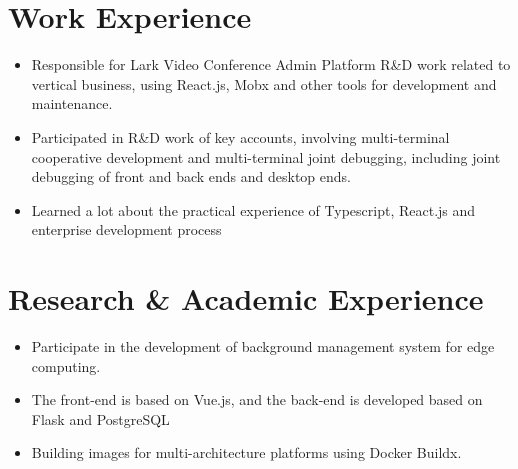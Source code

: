 \documentclass{resume}
\newcommand{\en}[1]{#1}
\newcommand{\zh}[1]{}
\begin{document}
\section{\en{Work Experience}\zh{工作经历}}
\en{}
\zh{\datedsubsection{\textbf{\href{https://www.bytedance.com/zh/}{字节跳动（ByteDance Inc.）}}}{2021/07 -- 2021/09}}
\en{}
\zh{\role{飞书会议室解决方案团队}{前端研发实习}}
\begin{itemize}
      \item \en{Responsible for Lark Video Conference Admin Platform R\&D work related to vertical business, using React.js, Mobx and other tools for development and maintenance.}
            \zh{负责飞书会议室 Admin 中会议室模块和视频会议模块相关垂直业务的前端研发，使用 React.js 和 Mobx 等工具进行业务等开发和维护}
      \item \en{Participated in R\&D work of key accounts, involving multi-terminal cooperative development and multi-terminal joint debugging, including joint debugging of front and back ends and desktop ends.}
            \zh{参与重点客户相关需求的开发，涉及到了多端合作开发与多端联合调试，包括前后端以及桌面端的联合调试}
      \item \en{Learned a lot about the practical experience of Typescript, React.js and enterprise development process}
            \zh{学到了很多关于 Typescript，React 以及企业级开发流程的实战经验}
\end{itemize}

\section{\en{Research \& Academic Experience}\zh{研究经历}}
\en{}
\zh{\datedsubsection{\textbf{中国科学院自动化研究所}}{2019/04 -- 2020/06}}
\en{}
\zh{\role{复杂系统管理与控制国家重点实验室}{科研实习}}
\begin{itemize}
      \item \en{Participate in the development of background management system for edge computing.}
            \zh{参与构建面向边缘计算的后台管理系统开发}
      \item \en{The front-end is based on Vue.js, and the back-end is developed based on Flask and PostgreSQL}
            \zh{前端基于 Vue.js 进行开发，后端基于 Flask 和 PostgreSQL 进行开发}
      \item \en{Building images for multi-architecture platforms using Docker Buildx.}
            \zh{使用 Docker Buildx 构建多系统架构支持的 Docker 镜像并部署}
\end{itemize}
\end{document}
